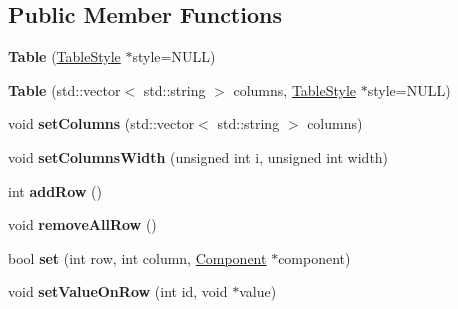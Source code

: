 \subsection*{Public Member Functions}
\begin{DoxyCompactItemize}
\item 
\hypertarget{classgraphics_1_1_table_aeeb8aa492ade3e61b711309f453641b5}{{\bfseries Table} (\hyperlink{classgraphics_1_1_table_style}{Table\-Style} $\ast$style=N\-U\-L\-L)}\label{classgraphics_1_1_table_aeeb8aa492ade3e61b711309f453641b5}

\item 
\hypertarget{classgraphics_1_1_table_a5c6f6b84d85a0df3b07f71bf2462744e}{{\bfseries Table} (std\-::vector$<$ std\-::string $>$ columns, \hyperlink{classgraphics_1_1_table_style}{Table\-Style} $\ast$style=N\-U\-L\-L)}\label{classgraphics_1_1_table_a5c6f6b84d85a0df3b07f71bf2462744e}

\item 
\hypertarget{classgraphics_1_1_table_a2c6abf40c3b5d21ab3b096fcaee16ce5}{void {\bfseries set\-Columns} (std\-::vector$<$ std\-::string $>$ columns)}\label{classgraphics_1_1_table_a2c6abf40c3b5d21ab3b096fcaee16ce5}

\item 
\hypertarget{classgraphics_1_1_table_a2e14782e71e215eb76b2d37167e1ed1e}{void {\bfseries set\-Columns\-Width} (unsigned int i, unsigned int width)}\label{classgraphics_1_1_table_a2e14782e71e215eb76b2d37167e1ed1e}

\item 
\hypertarget{classgraphics_1_1_table_a3fb5664b3d210665633230f539ee3b2a}{int {\bfseries add\-Row} ()}\label{classgraphics_1_1_table_a3fb5664b3d210665633230f539ee3b2a}

\item 
\hypertarget{classgraphics_1_1_table_a7fea8da6f8e2ac3d02d31ef0b84d8350}{void {\bfseries remove\-All\-Row} ()}\label{classgraphics_1_1_table_a7fea8da6f8e2ac3d02d31ef0b84d8350}

\item 
\hypertarget{classgraphics_1_1_table_adeacb8b5a9e0227997216c398bc5320f}{bool {\bfseries set} (int row, int column, \hyperlink{classgraphics_1_1_component}{Component} $\ast$component)}\label{classgraphics_1_1_table_adeacb8b5a9e0227997216c398bc5320f}

\item 
\hypertarget{classgraphics_1_1_table_a711a87fa22835b0f0c1e05cf0ce81f0a}{void {\bfseries set\-Value\-On\-Row} (int id, void $\ast$value)}\label{classgraphics_1_1_table_a711a87fa22835b0f0c1e05cf0ce81f0a}


\end{DoxyCompactItemize}
